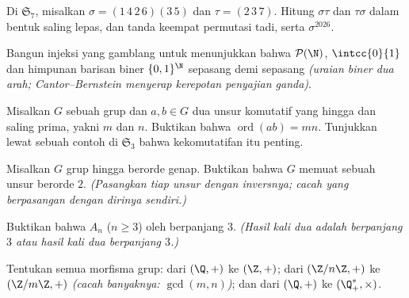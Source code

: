 \begin{exercise}[$\star$]\label{exo:b2:structures:2}
Di $\mathfrak{S}_7$, misalkan $\sigma = (1\,4\,2\,6)(3\,5)$ dan $\tau =
(2\,3\,7)$. Hitung $\sigma\tau$ dan $\tau\sigma$ dalam bentuk 
saling lepas,  dan tanda keempat permutasi tadi, serta
$\sigma^{2026}$.
\end{exercise}

\begin{exercise}[$\star$]\label{exo:b2:structures:3}
Bangun injeksi yang gamblang untuk menunjukkan bahwa $\mathcal{P}(\N)$,
$\intcc{0}{1}$ dan himpunan barisan biner $\{0,1\}^{\N}$ 
sepasang demi sepasang \emph{(uraian biner dua arah;
Cantor--Bernstein menyerap kerepotan penyajian ganda)}.
\end{exercise}

\begin{exercise}[$\star$]\label{exo:b2:structures:4}
Misalkan $G$ sebuah grup dan $a, b \in G$ dua unsur komutatif yang
 hingga dan saling prima, yakni $m$ dan $n$. Buktikan bahwa
$\operatorname{ord}(ab) = mn$. Tunjukkan lewat sebuah contoh di
$\mathfrak{S}_3$ bahwa kekomutatifan itu penting.
\end{exercise}

\begin{exercise}[$\star\star$]\label{exo:b2:structures:5}
Misalkan $G$ grup hingga berorde genap. Buktikan bahwa $G$ memuat
sebuah unsur berorde $2$. \emph{(Pasangkan tiap unsur dengan inversnya;
cacah yang berpasangan dengan dirinya sendiri.)}
\end{exercise}

\begin{exercise}[$\star\star$]\label{exo:b2:structures:6}
Buktikan bahwa $A_n$ ($n \geq 3$)  oleh  berpanjang $3$.
\emph{(Hasil kali dua  adalah  berpanjang $3$ atau
hasil kali dua  berpanjang $3$.)}
\end{exercise}

\begin{exercise}[$\star\star$]\label{exo:b2:structures:7}
Tentukan semua morfisma grup: dari $(\Q, +)$ ke $(\Z, +)$; dari
$(\Z/n\Z, +)$ ke $(\Z/m\Z, +)$ \emph{(cacah banyaknya:
$\gcd(m,n)$)}; dan dari $(\Q, +)$ ke $(\Q_+^*, \times)$.
\end{exercise}


